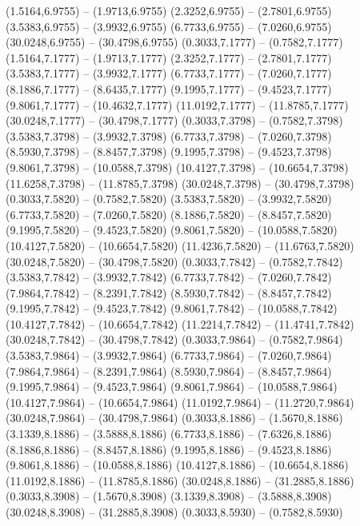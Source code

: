 {\begin{scope}[shift={(#1,#2)}]
    (1.5164,6.9755) -- (1.9713,6.9755)
    (2.3252,6.9755) -- (2.7801,6.9755)
    (3.5383,6.9755) -- (3.9932,6.9755)
    (6.7733,6.9755) -- (7.0260,6.9755)
    (30.0248,6.9755) -- (30.4798,6.9755)
    (0.3033,7.1777) -- (0.7582,7.1777)
    (1.5164,7.1777) -- (1.9713,7.1777)
    (2.3252,7.1777) -- (2.7801,7.1777)
    (3.5383,7.1777) -- (3.9932,7.1777)
    (6.7733,7.1777) -- (7.0260,7.1777)
    (8.1886,7.1777) -- (8.6435,7.1777)
    (9.1995,7.1777) -- (9.4523,7.1777)
    (9.8061,7.1777) -- (10.4632,7.1777)
    (11.0192,7.1777) -- (11.8785,7.1777)
    (30.0248,7.1777) -- (30.4798,7.1777)
    (0.3033,7.3798) -- (0.7582,7.3798)
    (3.5383,7.3798) -- (3.9932,7.3798)
    (6.7733,7.3798) -- (7.0260,7.3798)
    (8.5930,7.3798) -- (8.8457,7.3798)
    (9.1995,7.3798) -- (9.4523,7.3798)
    (9.8061,7.3798) -- (10.0588,7.3798)
    (10.4127,7.3798) -- (10.6654,7.3798)
    (11.6258,7.3798) -- (11.8785,7.3798)
    (30.0248,7.3798) -- (30.4798,7.3798)
    (0.3033,7.5820) -- (0.7582,7.5820)
    (3.5383,7.5820) -- (3.9932,7.5820)
    (6.7733,7.5820) -- (7.0260,7.5820)
    (8.1886,7.5820) -- (8.8457,7.5820)
    (9.1995,7.5820) -- (9.4523,7.5820)
    (9.8061,7.5820) -- (10.0588,7.5820)
    (10.4127,7.5820) -- (10.6654,7.5820)
    (11.4236,7.5820) -- (11.6763,7.5820)
    (30.0248,7.5820) -- (30.4798,7.5820)
    (0.3033,7.7842) -- (0.7582,7.7842)
    (3.5383,7.7842) -- (3.9932,7.7842)
    (6.7733,7.7842) -- (7.0260,7.7842)
    (7.9864,7.7842) -- (8.2391,7.7842)
    (8.5930,7.7842) -- (8.8457,7.7842)
    (9.1995,7.7842) -- (9.4523,7.7842)
    (9.8061,7.7842) -- (10.0588,7.7842)
    (10.4127,7.7842) -- (10.6654,7.7842)
    (11.2214,7.7842) -- (11.4741,7.7842)
    (30.0248,7.7842) -- (30.4798,7.7842)
    (0.3033,7.9864) -- (0.7582,7.9864)
    (3.5383,7.9864) -- (3.9932,7.9864)
    (6.7733,7.9864) -- (7.0260,7.9864)
    (7.9864,7.9864) -- (8.2391,7.9864)
    (8.5930,7.9864) -- (8.8457,7.9864)
    (9.1995,7.9864) -- (9.4523,7.9864)
    (9.8061,7.9864) -- (10.0588,7.9864)
    (10.4127,7.9864) -- (10.6654,7.9864)
    (11.0192,7.9864) -- (11.2720,7.9864)
    (30.0248,7.9864) -- (30.4798,7.9864)
    (0.3033,8.1886) -- (1.5670,8.1886)
    (3.1339,8.1886) -- (3.5888,8.1886)
    (6.7733,8.1886) -- (7.6326,8.1886)
    (8.1886,8.1886) -- (8.8457,8.1886)
    (9.1995,8.1886) -- (9.4523,8.1886)
    (9.8061,8.1886) -- (10.0588,8.1886)
    (10.4127,8.1886) -- (10.6654,8.1886)
    (11.0192,8.1886) -- (11.8785,8.1886)
    (30.0248,8.1886) -- (31.2885,8.1886)
    (0.3033,8.3908) -- (1.5670,8.3908)
    (3.1339,8.3908) -- (3.5888,8.3908)
    (30.0248,8.3908) -- (31.2885,8.3908)
    (0.3033,8.5930) -- (0.7582,8.5930)

\end{scope}}
